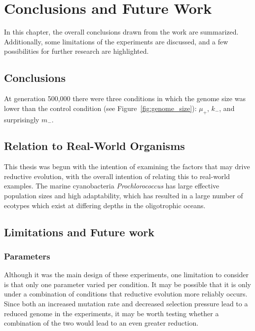 
\chapter{Conclusions and Future Work}\label{ch:conclusion}
In this chapter, the overall conclusions drawn from the work are summarized. Additionally, some limitations of the experiments are discussed, and a few possibilities for further research are highlighted.

\section{Conclusions}
At generation 500,000 there were three conditions in which the genome size was lower than the control condition (see Figure~\ref{fig:genome_size}): $\mu_+$, $k_-$, and surprisingly $m_-$. 

\section{Relation to Real-World Organisms}
This thesis was begun with the intention of examining the factors that may drive reductive evolution, with the overall intention of relating this to real-world examples. The marine cyanobacteria \textit{Prochlorococcus} has large effective population sizes and high adaptability, which has resulted in a large number of ecotypes which exist at differing depths in the oligotrophic oceans. 
  
\section{Limitations and Future work}\label{limitations}
\subsection{Parameters}
Although it was the main design of these experiments, one limitation to consider is that only one parameter varied per condition. It may be possible that it is only under a combination of conditions that reductive evolution more reliably occurs. Since both an increased mutation rate and decreased selection pressure lead to a reduced genome in the experiments, it may be worth testing whether a combination of the two would lead to an even greater reduction. 

